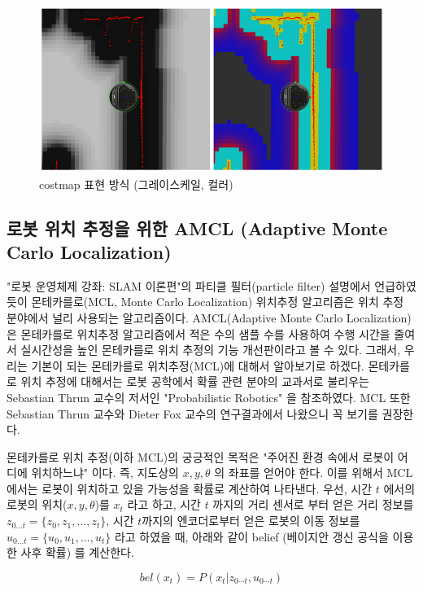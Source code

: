 \begin{figure}[h]
\centering
\includegraphics[width=0.8\columnwidth]{pictures/chapter11/costmap_gray.png}
\caption{costmap 표현 방식 (그레이스케일, 컬러)}
\end{figure}

\subsection{로봇 위치 추정을 위한 AMCL (Adaptive Monte Carlo Localization)}

"로봇 운영체제 강좌: SLAM 이론편"의 파티클 필터(particle filter) 설명에서 언급하였듯이 몬테카를로(MCL, Monte Carlo Localization) 위치추정 알고리즘은 위치 추정 분야에서 널리 사용되는 알고리즘이다. AMCL(Adaptive Monte Carlo Localization) 은 몬테카를로 위치추정 알고리즘에서 적은 수의 샘플 수를 사용하여 수행 시간을 줄여서 실시간성을 높인 몬테카를로 위치 추정의 기능 개선판이라고 볼 수 있다. 그래서, 우리는 기본이 되는 몬테카를로 위치추정(MCL)에 대해서 알아보기로 하겠다. 몬테카를로 위치 추정에 대해서는 로봇 공학에서 확률 관련 분야의 교과서로 불리우는 Sebastian Thrun 교수의 저서인 "Probabilistic Robotics"\cite{thrun2005probabilistic} 을 참조하였다. MCL 또한 Sebastian Thrun 교수와 Dieter Fox 교수의 연구결과\cite{fox1999monte,dellaert1999monte}에서 나왔으니 꼭 보기를 권장한다.

몬테카를로 위치 추정(이하 MCL)의 궁긍적인 목적은 "주어진 환경 속에서 로봇이 어디에 위치하느냐" 이다. 즉, 지도상의 $x, y, \theta$ 의 좌표를 얻어야 한다. 이를 위해서 MCL 에서는 로봇이 위치하고 있을 가능성을 확률로 계산하여 나타낸다. 우선, 시간 $t$ 에서의 로봇의 위치($x, y, \theta$)를  $x_t$ 라고 하고, 시간 $t$ 까지의 거리 센서로 부터 얻은 거리 정보를 $z_{0...t} = \{z_0, z_1, ..., z_t\}$, 시간 $t$까지의 엔코더로부터 얻은 로봇의 이동 정보를 $u_{0...t} = \{u_0, u_1, ..., u_t\}$ 라고 하였을 때, 아래와 같이 belief (베이지안 갱신 공식을 이용한 사후 확률) 를 계산한다.

\begin{equation}
  bel(x_t) = P(x_t|z_{0\cdots t},u_{0\cdots t})
\end{equation}

